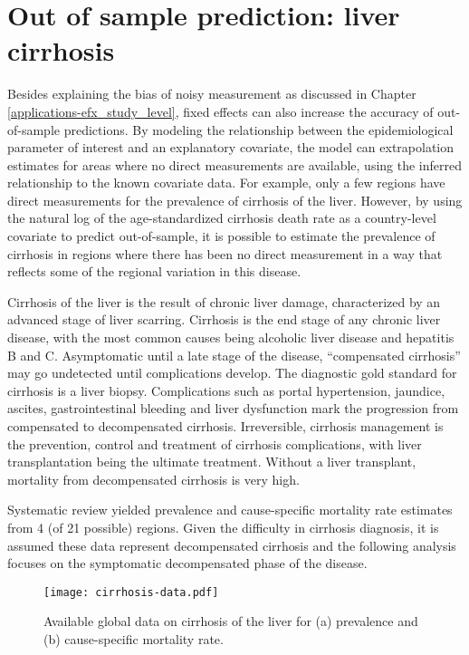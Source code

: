 \chapter{Out of sample prediction: liver cirrhosis}
\label{applications-efx_country_level}

Besides explaining the bias of noisy measurement as discussed in
Chapter \ref{applications-efx_study_level}, fixed effects can also
increase the accuracy of out-of-sample predictions.  By modeling the
relationship between the epidemiological parameter of interest and an
explanatory covariate, the model can extrapolation estimates for areas
where no direct measurements are available, using the inferred
relationship to the known covariate data.  For example, only a few
regions have direct measurements for the prevalence of cirrhosis of
the liver.  However, by using the natural log of the age-standardized
cirrhosis death rate as a country-level covariate to predict
out-of-sample, it is possible to estimate the prevalence of cirrhosis
in regions where there has been no direct measurement in a way that
reflects some of the regional variation in this disease.

Cirrhosis of the liver is the result of chronic liver damage,
characterized by an advanced stage of liver scarring.  Cirrhosis is
the end stage of any chronic liver disease, with the most common
causes being alcoholic liver disease and hepatitis B and C.
Asymptomatic until a late stage of the disease, ``compensated
cirrhosis'' may go undetected until complications develop.  The
diagnostic gold standard for cirrhosis is a liver biopsy.
Complications such as portal hypertension, jaundice, ascites,
gastrointestinal bleeding and liver dysfunction mark the progression
from compensated to decompensated cirrhosis.  Irreversible, cirrhosis
management is the prevention, control and treatment of cirrhosis
complications, with liver transplantation being the ultimate
treatment.  Without a liver transplant, mortality from decompensated
cirrhosis is very high. \cite{garcia-tsao_management_2009,
  damico_natural_2006, schuppan_liver_2008}

Systematic review yielded prevalence and cause-specific mortality rate
estimates from 4 (of 21 possible) regions.  Given the difficulty in
cirrhosis diagnosis, it is assumed these data represent decompensated
cirrhosis and the following analysis focuses on the symptomatic
decompensated phase of the disease.

    \begin{figure}[h]
        \begin{center}
            \texttt{[image: cirrhosis-data.pdf]}
            \caption{Available global data on cirrhosis of the liver
              for (a) prevalence and (b) cause-specific mortality
              rate.}
            \label{fig:app-cirrhosis data}
        \end{center}
    \end{figure}

